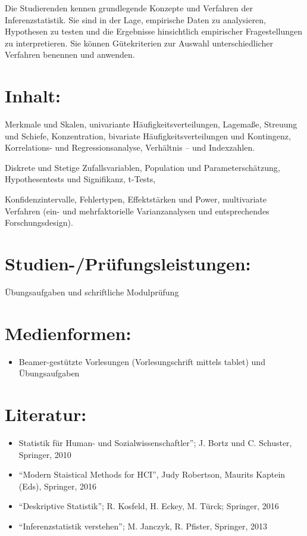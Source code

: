 Die Studierenden kennen grundlegende Konzepte und Verfahren der
Inferenzstatistik. Sie sind in der Lage, empirische Daten zu
analysieren, Hypothesen zu testen und die Ergebnisse hinsichtlich
empirischer Fragestellungen zu interpretieren. Sie können Gütekriterien
zur Auswahl unterschiedlicher Verfahren benennen und anwenden.

\section*{Inhalt:}\label{inhalt-6}

Merkmale und Skalen, univariante Häufigkeitsverteilungen, Lagemaße,
Streuung und Schiefe, Konzentration, bivariate Häufigkeitsverteilungen
und Kontingenz, Korrelations- und Regressionsanalyse, Verhältnis -- und
Indexzahlen.

Diskrete und Stetige Zufallsvariablen, Population und
Parameterschätzung, Hypothesentests und Signifikanz, t-Tests,

Konfidenzintervalle, Fehlertypen, Effektstärken und Power, multivariate
Verfahren (ein- und mehrfaktorielle Varianzanalysen und entsprechendes
Forschungsdesign).

\section*{Studien-/Prüfungsleistungen:}\label{studien-pruxfcfungsleistungen-6}

Übungsaufgaben und schriftliche Modulprüfung

\section*{Medienformen:}\label{medienformen-6}

\begin{itemize}
\tightlist
\item
  Beamer-gestützte Vorlesungen (Vorlesungschrift mittels tablet) und
  Übungsaufgaben
\end{itemize}

\section*{Literatur:}\label{literatur-6}

\begin{itemize}
\item
  Statistik für Human- und Sozialwissenschaftler''; J. Bortz und C.
  Schuster, Springer, 2010
\item
  ``Modern Staistical Methods for HCI'', Judy Robertson, Maurits Kaptein
  (Eds), Springer, 2016
\item
  ``Deskriptive Statistik''; R. Kosfeld, H. Eckey, M. Türck; Springer,
  2016
\item
  ``Inferenzstatistik verstehen''; M. Janczyk, R. Pfister, Springer,
  2013
\end{itemize}


